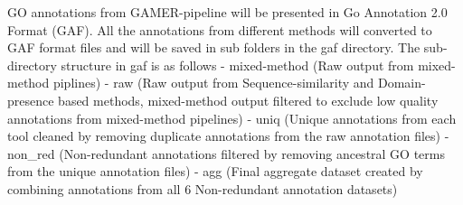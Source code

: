 \documentclass[11pt,letterpaper]{article}
\begin{document}
GO annotations from GAMER-pipeline will be presented in Go Annotation
2.0 Format (GAF). All the annotations from different methods will
converted to GAF format files and will be saved in sub folders in the
gaf directory. The sub-directory structure in gaf is as follows -
mixed-method (Raw output from mixed-method piplines) - raw (Raw output
from Sequence-similarity and Domain-presence based methods, mixed-method
output filtered to exclude low quality annotations from mixed-method
pipelines) - uniq (Unique annotations from each tool cleaned by removing
duplicate annotations from the raw annotation files) - non\_red
(Non-redundant annotations filtered by removing ancestral GO terms from
the unique annotation files) - agg (Final aggregate dataset created by
combining annotations from all 6 Non-redundant annotation datasets)
\end{document}
